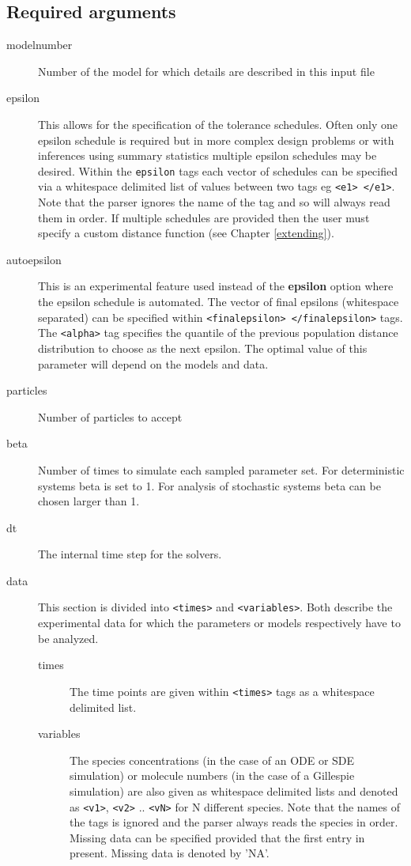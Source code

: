 \documentclass[a4paper]{report}
\begin{document}
\subsection{Required arguments}
\begin{description}
	\item[modelnumber] Number of the model for which details are described in this input file
	\item[epsilon] This allows for the specification of the tolerance schedules. Often only one epsilon schedule is required but in more complex design problems or with inferences using summary statistics multiple epsilon schedules may be desired. Within the \verb$epsilon$ tags each vector of schedules can be specified via a whitespace delimited list of values between two tags eg \verb$<e1> </e1>$. Note that the parser ignores the name of the tag and so will always read them in order. If multiple schedules are provided then the user must specify a custom distance function (see Chapter \ref{extending}).
	\item[autoepsilon] This is an experimental feature used instead of the {\bf epsilon} option where the epsilon schedule is automated. The vector of final epsilons (whitespace separated) can be specified within \verb$<finalepsilon> </finalepsilon>$ tags. The \verb$<alpha>$ tag specifies the quantile of the previous population distance distribution to choose as the next epsilon. The optimal value of this parameter will depend on the models and data.
	\item[particles] Number of particles to accept
	\item[beta] Number of times to simulate each sampled parameter set. For deterministic systems beta is set to 1. For analysis of stochastic systems beta can be chosen larger than 1.
	\item[dt] The internal time step for the solvers.

	\item[data] This section is divided into \verb$<times>$ and \verb$<variables>$. Both describe the experimental data for which the parameters or models respectively have to be analyzed. 
	\begin{description}
		\item[times]The time points are given within \verb$<times>$ tags as a whitespace delimited list. 
		\item[variables]The species concentrations (in the case of an ODE or SDE simulation) or molecule numbers (in the case of a Gillespie simulation) are also given as whitespace delimited lists and denoted as \verb$<v1>$, \verb$<v2>$ .. \verb$<vN>$ for N different species. Note that the names of the tags is ignored and the parser always reads the species in order. Missing data can be specified provided that the first entry in present. Missing data is denoted by 'NA'.
	\end{description}


\end{description}
\end{document}
